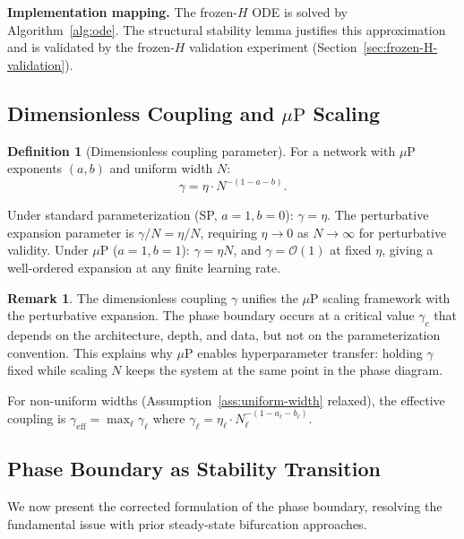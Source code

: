 \documentclass[11pt]{article}
\theoremstyle{definition}
\newtheorem{definition}[theorem]{Definition}
\newtheorem{remark}[theorem]{Remark}
\newcommand{\cO}{\mathcal{O}}
\newcommand{\muP}{\mu\text{P}}
\begin{document}
\textbf{Implementation mapping.} The frozen-$H$ ODE is solved by Algorithm~\ref{alg:ode}. The structural stability lemma justifies this approximation and is validated by the frozen-$H$ validation experiment (Section~\ref{sec:frozen-H-validation}).

\subsection{Dimensionless Coupling and $\muP$ Scaling}
\label{sec:gamma}

\begin{definition}[Dimensionless coupling parameter]
\label{def:gamma}
For a network with $\muP$ exponents $(a, b)$ and uniform width $N$:
\begin{equation}
\label{eq:gamma}
\gamma = \eta \cdot N^{-(1-a-b)}.
\end{equation}
\end{definition}

Under standard parameterization (SP, $a=1, b=0$): $\gamma = \eta$. The perturbative expansion parameter is $\gamma/N = \eta/N$, requiring $\eta \to 0$ as $N \to \infty$ for perturbative validity. Under $\muP$ ($a=1, b=1$): $\gamma = \eta N$, and $\gamma = \cO(1)$ at fixed $\eta$, giving a well-ordered expansion at any finite learning rate.

\begin{remark}
The dimensionless coupling $\gamma$ unifies the $\muP$ scaling framework with the perturbative expansion. The phase boundary occurs at a critical value $\gamma_c$ that depends on the architecture, depth, and data, but not on the parameterization convention. This explains why $\muP$ enables hyperparameter transfer: holding $\gamma$ fixed while scaling $N$ keeps the system at the same point in the phase diagram.
\end{remark}

For non-uniform widths (Assumption~\ref{ass:uniform-width} relaxed), the effective coupling is $\gamma_{\mathrm{eff}} = \max_\ell \gamma_\ell$ where $\gamma_\ell = \eta_\ell \cdot N_\ell^{-(1-a_\ell - b_\ell)}$.

\subsection{Phase Boundary as Stability Transition}
\label{sec:phase-boundary}

We now present the corrected formulation of the phase boundary, resolving the fundamental issue with prior steady-state bifurcation approaches.
\end{document}
